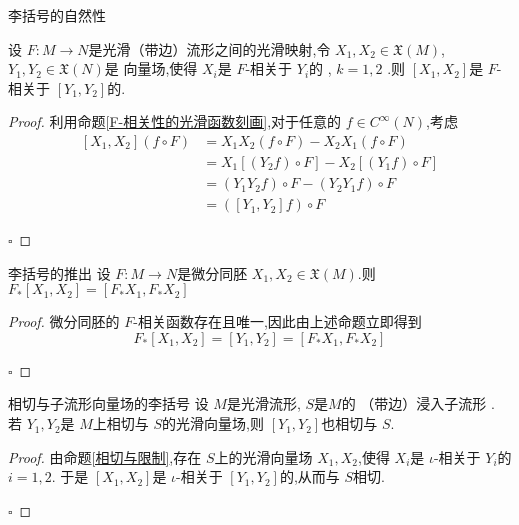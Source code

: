 \documentclass[../../几何与拓扑.tex]{subfiles}
\begin{document}
\begin{proposition}{李括号的自然性}

    设 \(  F: M\to N  \)是光滑（带边）流形之间的光滑映射,令 \(  X_1, X_2 \in \mathfrak{X}\left( M \right)  \), \(  Y_1,Y_2 \in \mathfrak{X}\left( N \right)   \)是
    向量场,使得 \(  X_{i}  \)是 \(  F  \)-相关于 \(  Y_{i}  \)的 , \(  k= 1,2  \)       .则 \(  [X_1,X_2]  \)是 \(  F  \)-相关于 \(  [Y_1,Y_2]  \)的.   
    
\end{proposition}

\begin{proof}
    利用命题\ref{F-相关性的光滑函数刻画},对于任意的 \(  f \in C^{\infty}\left( N \right)   \),考虑 \[
    \begin{aligned}
    \left[ X_1,X_2 \right] \left( f\circ F \right) & = X_1X_2\left( f\circ F \right)-X_2X_1\left( f\circ F \right)      \\ 
     & =  X_1 [\left( Y_2f \right) \circ F]- X_2[\left( Y_1f \right) \circ F]\\ 
      & =  \left( Y_1Y_2f \right)\circ F -\left(  Y_2Y_1f   \right)\circ F\\ 
       & = \left(  [Y_1,Y_2]f \right)\circ F  
    \end{aligned}
    \]

    \hfill $\square$
\end{proof}

\begin{corollary}{李括号的推出}
    设 \(  F:M \to N  \)是微分同胚 \(  X_1,X_2 \in \mathfrak{X}\left( M \right)   \).则 \(  F_{*}[X_1,X_2]= [F_{*}X_1,F_{*}X_2]  \)   
\end{corollary}
\begin{proof}
    微分同胚的 \(  F  \)-相关函数存在且唯一,因此由上述命题立即得到 \[
    F_{*}[X_1,X_2]= [Y_1,Y_2]= [F_{*}X_1,F_{*}X_2]
    \] 

    \hfill $\square$
\end{proof}

\begin{corollary}{相切与子流形向量场的李括号}
    设 \(  M  \)是光滑流形, \(  S  \)是\(  M  \)的 （带边）浸入子流形  .
    若 \(  Y_1,Y_2  \)是 \(  M  \)上相切与 \(  S  \)的光滑向量场,则 \(  \left[ Y_1,Y_2 \right]   \)也相切与 \(  S  \).     
\end{corollary}

\begin{proof}
    由命题\ref{相切与限制},存在 \(  S  \)上的光滑向量场 \(  X_1,X_2  \),使得 \(  X_{i}  \)是 \( \iota   \)-相关于 \(  Y_{i}  \)的 \(  i= 1,2  \).
    于是 \(  [X_1,X_2]  \)是 \(  \iota   \)-相关于 \(  [Y_1,Y_2]  \)的,从而与 \(  S  \)相切.          

    \hfill $\square$
\end{proof}
\end{document}
